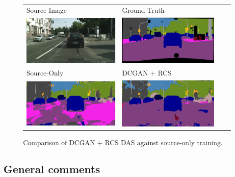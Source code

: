 \documentclass[a4paper,12pt]{report}
\begin{document}
\begin{figure}[]
    \centering
    \begin{tabular}{llll}
        Source Image                                                                       & Ground Truth                                                                        \\
        \includegraphics[width=.4\linewidth,valign=m]{res/das-qualitative/image.png}       & \includegraphics[width=.4\linewidth,valign=m]{res/das-qualitative/ground-truth.png} \\
        Source-Only                                                                        & DCGAN + RCS                                                                         \\
        \includegraphics[width=.4\linewidth,valign=m]{res/das-qualitative/source-only.png} & \includegraphics[width=.4\linewidth,valign=m]{res/das-qualitative/dcgan-rcs.png}    \\
    \end{tabular}
    \caption{Comparison of DCGAN + RCS DAS against source-only training.}
    \label{fig:das-qualitative}
\end{figure}

\subsection{General comments}
\end{document}
